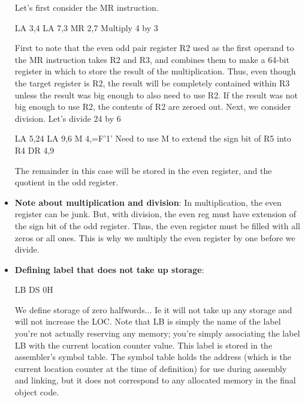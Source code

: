 \documentclass{report}
\begin{document}
\begin{itemize}
                    \bigbreak \noindent 
                    Let's first consider the MR instruction.
                    \bigbreak \noindent 
                    \begin{cppcode}
                    LA   3,4
                    LA   7,3
                    MR   2,7      Multiply 4 by 3
                    \end{cppcode}
                    \bigbreak \noindent 
                    First to note that the even odd pair register R2 used as the first operand to the MR instruction takes R2 and R3, and combines them to make a 64-bit register in which to store the result of the multiplication. Thus, even though the target register is R2, the result will be completely contained within R3 unless the result was big enough to also need to use R2. If the result was not big enough to use R2, the contents of R2 are zeroed out.
                    \bigbreak \noindent 
                    Next, we consider division. Let's divide 24 by 6
                    \bigbreak \noindent 
                    \begin{cppcode}
                    LA  5,24
                    LA  9,6
                    M   4,=F'1'   Need to use M to extend the sign bit of R5 into R4
                    DR  4,9
                    \end{cppcode}
                    \bigbreak \noindent 
                    The remainder in this case will be stored in the even register, and the quotient in the odd register.
                \item \textbf{Note about multiplication and division}: In multiplication, the even register can be junk. But, with division, the even reg must have extension of the sign bit of the odd register. Thus, the even register must be filled with all zeros or all ones. This is why we multiply the even register by one before we divide. 
                \item \textbf{Defining label that does not take up storage}: 
                    \bigbreak \noindent 
                    \begin{cppcode}
                    LB   DS  0H
                    \end{cppcode}
                    \bigbreak \noindent 
                    We define storage of zero halfwords... Ie it will not take up any storage and will not increase the LOC. Note that LB is simply the name of the label
                    \bigbreak \noindent 
                    you're not actually reserving any memory; you're simply associating the label LB with the current location counter value. This label is stored in the assembler's symbol table. The symbol table holds the address (which is the current location counter at the time of definition) for use during assembly and linking, but it does not correspond to any allocated memory in the final object code.

\end{itemize}
\end{document}
